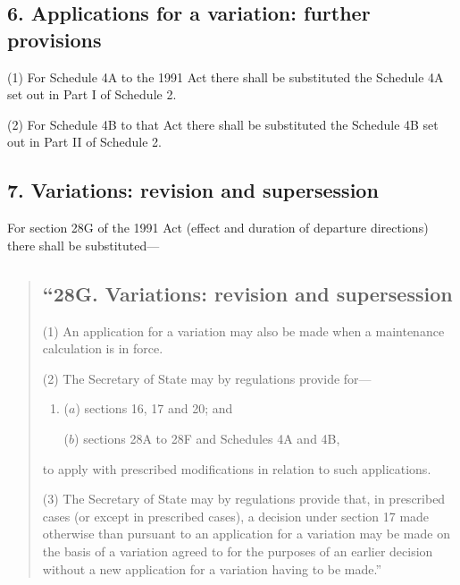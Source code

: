 \documentclass[12pt,a4paper]{article}
\begin{document}

\subsection{6. Applications for a variation: further provisions}

(1) For Schedule 4A to the 1991 Act there shall be substituted the Schedule 4A set out in Part I of Schedule 2. 

(2) For Schedule 4B to that Act there shall be substituted the Schedule 4B set out in Part II of Schedule 2. 


\subsection{7. Variations: revision and supersession}

For section 28G of the 1991 Act (effect and duration of departure directions) there shall be substituted—
\begin{quotation}
\subsection*{“28G. Variations: revision and supersession}

(1) An application for a variation may also be made when a maintenance calculation is in force.

(2) The Secretary of State may by regulations provide for—
\begin{enumerate}\item[]
($a$) sections 16, 17 and 20; and

($b$) sections 28A to 28F and Schedules 4A and 4B,
\end{enumerate}
to apply with prescribed modifications in relation to such applications.

(3) The Secretary of State may by regulations provide that, in prescribed cases (or except in prescribed cases), a decision under section 17 made otherwise than pursuant to an application for a variation may be made on the basis of a variation agreed to for the purposes of an earlier decision without a new application for a variation having to be made.”
\end{quotation}
\end{document}
